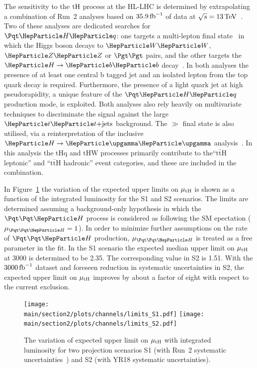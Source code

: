 
The sensitivity to the $\text{tH}$ process at the HL-LHC is determined by extrapolating a combination of Run~2 analyses based on $35.9\mbox{\ensuremath{\,\text{fb}^\text{$-$1}}}$ of data at $\sqrt{s}= 13 \,\text{Te\hspace{-.08em}V}$~\cite{CMS-PAS-HIG-18-009}. Two of these  analyses are dedicated searches for $\tHq$: one targets a multi-lepton final state~\cite{CMS-PAS-HIG-17-005} in which the Higgs boson decays to $\ww$, $\zz$ or $\tautau$ pairs, and the other targets the $\hbb$ decay~\cite{CMS_PAS_HIG_17-016}. In both analyses the presence of at least one central b tagged jet and an isolated lepton from the top quark decay is required. Furthermore, the presence of a light quark jet at high pseudorapidity, a unique feature of the $\tHq$ production mode, is exploited. Both analyses also rely heavily on multivariate techniques to discriminate the signal against the large $\ttjets$ background. The $\gg$ final state is also utilised, via a reinterpretation of the inclusive $\hgg$ analysis~\cite{Sirunyan:2018ouh}. In this analysis the $\mathrm{tHq}$ and $\mathrm{tHW}$ processes primarily contribute to the``$\mathrm{t\bar{t}H}$ leptonic'' and ``$\mathrm{t\bar{t}H}$ hadronic'' event categories, and these are included in the combination.


In Figure~\ref{fig:limit} the variation of the expected upper limits on $\mu_{\text{tH}}$ is shown as a function of the integrated luminosity for the S1 and S2 scenarios. The limits are determined assuming a background-only hypothesis in which the $\tth$ process is considered as following the SM epectation ($\mu_{\tth} = 1$). In order to minimize further assumptions on the rate of $\tth$ production, $\mu_{\tth}$ is treated as a free parameter in the fit.
In the S1 scenario the expected median upper limit on $\mu_{\text{tH}}$ at 3000 \fbinv is determined to be 2.35.
The corresponding value in S2 is 1.51. With the $3000 \mbox{\ensuremath{\,\text{fb}^\text{$-$1}}}$ dataset and foreseen reduction in systematic uncertainties in S2, the expected upper limit on $\mu_{\text{tH}}$ improves by about a factor of eight with respect to the current exclusion.

\begin{figure}[hbtp]
\begin{center}
\texttt{[image: \\main/section2/plots/channels/limits\_S1.pdf]} \hspace{1cm}
\texttt{[image: \\main/section2/plots/channels/limits\_S2.pdf]}
\end{center}
\caption{The variation of expected upper limit on $\mu_{\text{tH}}$ with integrated luminosity for two projection scenarios S1 (with Run~2 systematic uncertainties~\cite{CMS-PAS-HIG-18-009}) and S2 (with YR18 systematic uncertainties).}
\label{fig:limit}
\end{figure}

